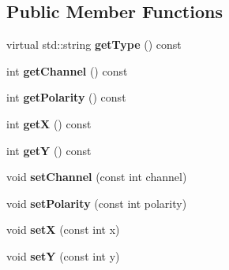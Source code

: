 \subsection*{Public Member Functions}
\begin{DoxyCompactItemize}
\item 
virtual std\+::string {\bfseries get\+Type} () const \hypertarget{classev_1_1AddressEvent_a11b6638defa5a38a42863002feccfcad}{}\label{classev_1_1AddressEvent_a11b6638defa5a38a42863002feccfcad}

\item 
int {\bfseries get\+Channel} () const \hypertarget{classev_1_1AddressEvent_a88038634ab480b42ac1f056abe004b5d}{}\label{classev_1_1AddressEvent_a88038634ab480b42ac1f056abe004b5d}

\item 
int {\bfseries get\+Polarity} () const \hypertarget{classev_1_1AddressEvent_add01928ce43dabc632bf91d18df09ed1}{}\label{classev_1_1AddressEvent_add01928ce43dabc632bf91d18df09ed1}

\item 
int {\bfseries getX} () const \hypertarget{classev_1_1AddressEvent_a1fd05781c5ea725826bed3f4ede0bc76}{}\label{classev_1_1AddressEvent_a1fd05781c5ea725826bed3f4ede0bc76}

\item 
int {\bfseries getY} () const \hypertarget{classev_1_1AddressEvent_ae382769a1bbb5429264aa56b34aebc77}{}\label{classev_1_1AddressEvent_ae382769a1bbb5429264aa56b34aebc77}

\item 
void {\bfseries set\+Channel} (const int channel)\hypertarget{classev_1_1AddressEvent_a50e188b1c5702cab67a2175b81c32767}{}\label{classev_1_1AddressEvent_a50e188b1c5702cab67a2175b81c32767}

\item 
void {\bfseries set\+Polarity} (const int polarity)\hypertarget{classev_1_1AddressEvent_a066b1e90b4d7faeaf68fa20bd6e0d3fa}{}\label{classev_1_1AddressEvent_a066b1e90b4d7faeaf68fa20bd6e0d3fa}

\item 
void {\bfseries setX} (const int x)\hypertarget{classev_1_1AddressEvent_aa99a38f1505796132e537cc3e54c7445}{}\label{classev_1_1AddressEvent_aa99a38f1505796132e537cc3e54c7445}

\item 
void {\bfseries setY} (const int y)\hypertarget{classev_1_1AddressEvent_abb2bb72a69c5241d0e293957a73135f6}{}\label{classev_1_1AddressEvent_abb2bb72a69c5241d0e293957a73135f6}


\end{DoxyCompactItemize}
